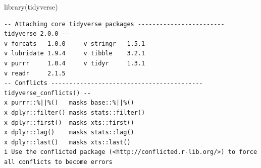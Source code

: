 \documentclass[
  letterpaper,
  DIV=11,
  numbers=noendperiod]{scrartcl}
\newenvironment{Shaded}{\begin{snugshade}}{\end{snugshade}}
\newcommand{\FunctionTok}[1]{\textcolor[rgb]{0.28,0.35,0.67}{#1}}
\newcommand{\NormalTok}[1]{\textcolor[rgb]{0.00,0.23,0.31}{#1}}
\begin{document}
\begin{Shaded}
\begin{Highlighting}[]
\FunctionTok{library}\NormalTok{(tidyverse)}
\end{Highlighting}
\end{Shaded}

\begin{verbatim}
-- Attaching core tidyverse packages ------------------------ tidyverse 2.0.0 --
v forcats   1.0.0     v stringr   1.5.1
v lubridate 1.9.4     v tibble    3.2.1
v purrr     1.0.4     v tidyr     1.3.1
v readr     2.1.5     
-- Conflicts ------------------------------------------ tidyverse_conflicts() --
x purrr::%||%()   masks base::%||%()
x dplyr::filter() masks stats::filter()
x dplyr::first()  masks xts::first()
x dplyr::lag()    masks stats::lag()
x dplyr::last()   masks xts::last()
i Use the conflicted package (<http://conflicted.r-lib.org/>) to force all conflicts to become errors
\end{verbatim}
\end{document}
